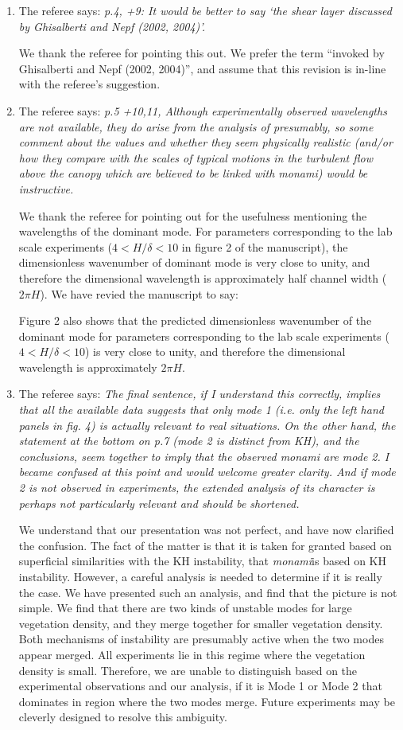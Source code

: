 \documentclass[letterpaper,10pt]{article}
\newcommand{\monami}{\textit{monami}}
\newcommand{\revise}[1]{{\color{blue} {#1}}}
\begin{document}
\begin{enumerate}
\item The referee says:
\textit{
p.4, +9: It would be better to say ‘the shear layer discussed by Ghisalberti and Nepf (2002, 2004)’.
}

We thank the referee for pointing this out. We prefer the term ``invoked by Ghisalberti and Nepf (2002, 2004)'', and assume that this revision is in-line with the referee's suggestion.

\item The referee says:
\textit{p.5 +10,11, Although experimentally observed wavelengths are not available, they do arise from the analysis of presumably, so some comment about the values and whether they seem physically realistic (and/or how they compare with the scales of typical motions in the turbulent flow above the canopy which are believed to be linked with monami) would be instructive.
}

We thank the referee for pointing out for the usefulness mentioning the wavelengths of the dominant mode. 
For parameters corresponding to the lab scale experiments ($4<H/\delta<10$ in figure 2 of the manuscript), the dimensionless wavenumber of dominant mode is very close to unity, and therefore the dimensional wavelength is approximately half channel width ($2\pi H$). We have revied the manuscript to say:

\revise{Figure 2 also shows that the predicted dimensionless wavenumber of the dominant mode for parameters corresponding to the lab scale experiments ($4<H/\delta<10$) is very close to unity, and therefore the dimensional wavelength is approximately $2\pi H$.}

\item The referee says:
\textit{
The final sentence, if I understand this correctly, implies that all the available data suggests that only mode 1 (i.e. only the left hand panels in fig. 4) is actually relevant to real situations. On the other hand, the statement at the bottom on p.7 (mode 2 is distinct from KH), and the conclusions, seem together to imply that the observed monami are mode 2. I became confused at this point and would welcome greater clarity. And if mode 2 is not observed in experiments, the extended analysis of its character is perhaps not particularly relevant and should be shortened.
}

We understand that our presentation was not perfect, and have now clarified the confusion. The fact of the matter is that it is taken for granted based on superficial similarities with the KH instability, that \monami is based on KH instability. However, a careful analysis is needed to determine if it is really the case. We have presented such an analysis, and find that the picture is not simple. We find that there are two kinds of unstable modes for large vegetation density, and they merge together for smaller vegetation density. Both mechanisms of instability are presumably active when the two modes appear merged. All experiments lie in this regime where the vegetation density is small. Therefore, we are unable to distinguish based on the experimental observations and our analysis, if it is Mode 1 or Mode 2 that dominates in region where the two modes merge. Future experiments may be cleverly designed to resolve this ambiguity.


\end{enumerate}
\end{document}
